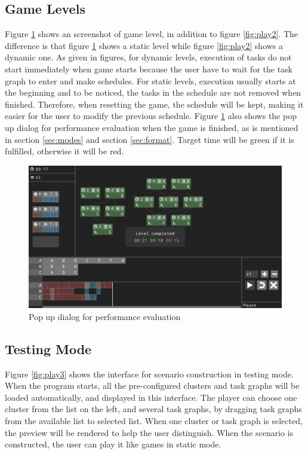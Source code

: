 \documentclass[msc,deptreport, cs]{infthesis}
\begin{document}
\subsection{Game Levels}

Figure \ref{fig:play6} shows an screenshot of game level, in addition to figure \ref{fig:play2}. The difference is that figure \ref{fig:play6} shows a static level while figure \ref{fig:play2} shows a dynamic one. As given in figures, for dynamic levels, execution of tasks do not start immediately when game starts because the user have to wait for the task graph to enter and make schedules. For static levels, execution usually starts at the beginning and to be noticed, the tasks in the schedule are not removed when finished. Therefore, when resetting the game, the schedule will be kept, making it easier for the user to modify the previous schedule. Figure \ref{fig:play6} also shows the pop up dialog for performance evaluation when the game is finished, as is mentioned in section \ref{sec:modes} and section \ref{sec:format}. Target time will be green if it is fulfilled, otherwise it will be red.

\begin{figure}[!htb]
  \centering
  \includegraphics[width=\columnwidth]{play6.png}
  \caption{Pop up dialog for performance evaluation}
  \label{fig:play6}
\end{figure}

\subsection{Testing Mode}

Figure \ref{fig:play3} shows the interface for scenario construction in testing mode. When the program starts, all the pre-configured clusters and task graphs will be loaded automatically, and displayed in this interface. The player can choose one cluster from the list on the left, and several task graphs, by dragging task graphs from the available list to selected list. When one cluster or task graph is selected, the preview will be rendered to help the user distinguish. When the scenario is constructed, the user can play it like games in static mode.
\end{document}
